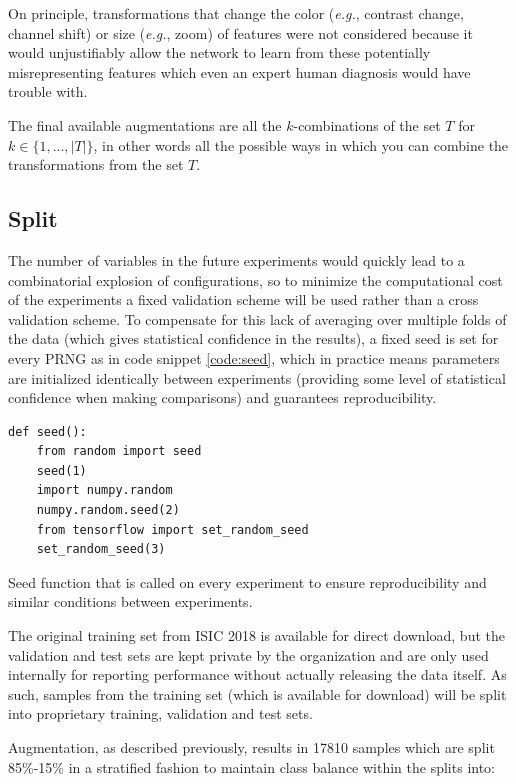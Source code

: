 On principle, transformations that change the color (\textit{e.g.}, contrast change, channel shift) or size (\textit{e.g.}, zoom) of features were not considered because it would unjustifiably allow the network to learn from these potentially misrepresenting features which even an expert human diagnosis would have trouble with.

The final available augmentations are all the $k$-combinations of the set $T$ for $k \in \{1, ..., |T|\}$, in other words all the possible ways in which you can combine the transformations from the set $T$.

\subsection{Split}

The number of variables in the future experiments would quickly lead to a combinatorial explosion of configurations, so to minimize the computational cost of the experiments a fixed validation scheme will be used rather than a cross validation scheme. To compensate for this lack of averaging over multiple folds of the data (which gives statistical confidence in the results), a fixed seed is set for every \ac{PRNG} as in code snippet \ref{code:seed}, which in practice means parameters are initialized identically between experiments (providing some level of statistical confidence when making comparisons) and guarantees reproducibility.

\begin{listing}[ht]
\begin{verbatim}
def seed():
    from random import seed
    seed(1)
    import numpy.random
    numpy.random.seed(2)
    from tensorflow import set_random_seed
    set_random_seed(3)
\end{verbatim}
\caption{Seed function that is called on every experiment to ensure reproducibility and similar conditions between experiments.}
\label{code:seed}
\end{listing}

The original training set from \ac{ISIC} 2018 is available for direct download, but the validation and test sets are kept private by the organization and are only used internally for reporting performance without actually releasing the data itself. As such, samples from the training set (which is available for download) will be split into proprietary training, validation and test sets.

Augmentation, as described previously, results in 17810 samples which are split 85\%-15\% in a stratified fashion to maintain class balance within the splits into:

